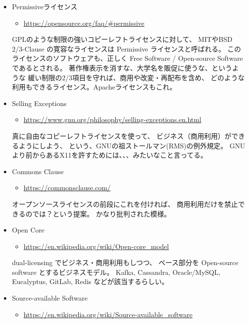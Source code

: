 \documentclass{jsarticle}
\begin{document}
\begin{itemize}
\item Permissiveライセンス
\begin{itemize}
\item \url{https://opensource.org/faq/#permissive}
\end{itemize}

GPLのような制限の強いコピーレフトライセンスに対して、
MITやBSD 2/3-Clause の寛容なライセンスは Permissive ライセンスと呼ばれる。
このライセンスのソフトウェアも、正しく Free Software / Open-source Software
であるとされる。
著作権表示を消すな、大学名を販促に使うな、というような
緩い制限の2/3項目を守れば、商用や改変・再配布を含め、
どのような利用もできるライセンス。Apacheライセンスもこれ。

\item Selling Exceptions
\begin{itemize}
\item \url{https://www.gnu.org/philosophy/selling-exceptions.en.html}
\end{itemize}

真に自由なコピーレフトライセンスを使って、
ビジネス（商用利用）ができるようにしよう、
という、GNUの祖ストールマン(RMS)の例外規定。
GNUより前からあるX11を許すためには、、、みたいなこと言ってる。

\item Commons Clause
\begin{itemize}
\item \url{https://commonsclause.com/}
\end{itemize}

オープンソースライセンスの前段にこれを付ければ、
商用利用だけを禁止できるのでは？という提案。
かなり批判された模様。

\item Open Core
\begin{itemize}
\item \url{https://en.wikipedia.org/wiki/Open-core_model}
\end{itemize}

dual-licensing でビジネス・商用利用もしつつ、
ベース部分を Open-source software とするビジネスモデル。
Kafka, Cassandra, Oracle/MySQL, Eucalyptus, GitLab, Redis
などが該当するらしい。

\item Source-available Software
\begin{itemize}
\item \url{https://en.wikipedia.org/wiki/Source-available_software}
\end{itemize}


\end{itemize}
\end{document}
